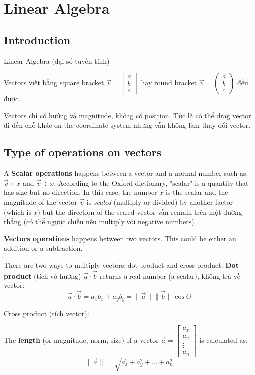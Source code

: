 \chapter{Linear Algebra}

\section{Introduction}

Linear Algebra (đại số tuyến tính)

Vectors viết bằng square bracket $\vec{v}=\begin{bmatrix}
a\\b\\c
\end{bmatrix}$ hay round bracket $\vec{v}=\begin{pmatrix}
a\\b\\c
\end{pmatrix}$ đều được.

Vectors chỉ có hướng và magnitude, không có position. Tức là có thể drag vector đi đến chỗ khác on the coordinate system nhưng vẫn không làm thay đổi vector.

\section{Type of operations on vectors}

A \textbf{Scalar operations} happens between a vector and a normal number such as: $\vec{v} \times x$ and $\vec{v} \div x$. According to the Oxford dictionary, "scalar" is a quantity that has size but no direction. In this case, the number $x$ is the scalar and the magnitude of the vector $\vec{v}$ is \textit{scaled} (multiply or divided) by another factor (which is $x$) but the direction of the scaled vector vẫn remain trên một đường thẳng (có thể ngược chiều nếu multiply với negative numbers).

\textbf{Vectors operations} happens between two vectors. This could be either an addition or a subtraction.

There are two ways to multiply vectors: dot product and cross product. \textbf{Dot product} (tích vô hướng) $\vec{a} \cdot \vec{b}$ returns a real number (a scalar), không trả về vector: $$\vec{a} \cdot \vec{b} = a_{x}b_{x} + a_{y}b_{y} = \| \vec{a} \| \| \vec{b} \| \cos\Theta$$

Cross product (tích vector):

The \textbf{length} (or magnitude, norm, size) of a vector $\vec{a}=\begin{bmatrix}
a_x\\
a_y\\
\vdots\\
a_n
\end{bmatrix}$ is calculated as: $$\| \vec{a} \| =\sqrt{a_x^2 + a_y^2 + \dots + a_n^2}$$

